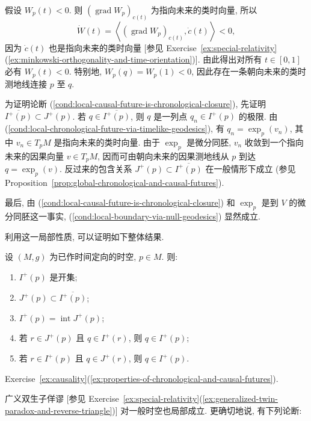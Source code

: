 \begin{RiemannProof}
假设 $W_p(t)<0$. 则 $(\operatorname{grad}W_p)_{c(t)}$ 为指向未来的类时向量, 所以
\[
  \dot W(t)=\left\langle(\operatorname{grad}W_p)_{c(t)},\dot c(t)\right\rangle<0,
\]
因为 $\dot c(t)$ 也是指向未来的类时向量 [参见 Exercise~\ref{ex:special-relativity}(\ref{ex:minkowski-orthogonality-and-time-orientation})]. 由此得出对所有 $t\in[0,1]$ 必有 $W_p(t)<0$. 特别地, $W_p(q)=W_p(1)<0$, 因此存在一条朝向未来的类时测地线连接 $p$ 至 $q$.

为证明论断 (\ref{cond:local-causal-future-is-chronological-closure}), 先证明 $\overline{I^+(p)}\subset J^+(p)$. 若 $q\in\overline{I^+(p)}$, 则 $q$ 是一列点 $q_n\in I^+(p)$ 的极限. 由 (\ref{cond:local-chronological-future-via-timelike-geodesics}), 有 $q_n=\exp_p(v_n)$, 其中 $v_n\in T_pM$ 是指向未来的类时向量. 由于 $\exp_p$ 是微分同胚, $v_n$ 收敛到一个指向未来的因果向量 $v\in T_pM$, 因而可由朝向未来的因果测地线从 $p$ 到达 $q=\exp_p(v)$. 反过来的包含关系 $J^+(p)\subset\overline{I^+(p)}$ 在一般情形下成立 (参见 Proposition~\ref{prop:global-chronological-and-causal-futures}).

最后, 由 (\ref{cond:local-causal-future-is-chronological-closure}) 和 $\exp_p$ 是到 $V$ 的微分同胚这一事实, (\ref{cond:local-boundary-via-null-geodesics}) 显然成立.
\end{RiemannProof}

利用这一局部性质, 可以证明如下整体结果.

\begin{RiemannProposition}\label{prop:global-chronological-and-causal-futures}
设 $(M,g)$ 为已作时间定向的时空, $p\in M$. 则:
\begin{enumerate}[label=(\arabic*),leftmargin=*]
\item $I^+(p)$ 是开集;
\item $J^+(p)\subset\overline{I^+(p)}$;
\item $I^+(p)=\operatorname{int}J^+(p)$;
\item 若 $r\in J^+(p)$ 且 $q\in I^+(r)$, 则 $q\in I^+(p)$;
\item 若 $r\in I^+(p)$ 且 $q\in J^+(r)$, 则 $q\in I^+(p)$.
\end{enumerate}
\end{RiemannProposition}

\begin{RiemannProof}
Exercise~\ref{ex:causality}(\ref{ex:properties-of-chronological-and-causal-futures}).
\end{RiemannProof}

广义双生子佯谬 [参见 Exercise~\ref{ex:special-relativity}(\ref{ex:generalized-twin-paradox-and-reverse-triangle})] 对一般时空也局部成立. 更确切地说, 有下列论断:

